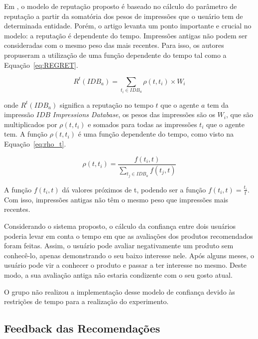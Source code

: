  Em \cite{sabater2001regret}, o modelo de reputação proposto é baseado no cálculo do parâmetro de reputação a partir da somatória dos pesos de impressões que o usuário tem de determinada entidade. Porém, o artigo levanta um ponto importante e crucial no modelo: a reputação é dependente do tempo. Impressões antigas não podem ser consideradas com o mesmo peso das mais recentes. Para isso, os autores propuseram a utilização de uma função dependente do tempo tal como a Equação~\ref{eq:REGRET}.
 
\begin{equation}
 R^t(IDB_a) = {\sum_{t_i\in{IDB_a}}}\rho(t,t_i)\times{W_i}
 \label{eq:REGRET} 
\end{equation}

 onde $R^t(IDB_a)$ significa a reputação no tempo $t$ que o agente $a$ tem da impressão $IDB$ \textit{Impressions Database}, os pesos das impressões são os $W_i$, que são multiplicados por $\rho(t,t_i)$ e somados para todas as impressões $t_i$ que o agente tem. A função $\rho(t,t_i)$ é uma função dependente do tempo, como visto na Equação~\ref{eq:rho_t}.
 
\begin{equation}
 \rho(t,t_i) = \frac{f(t_i,t)}{{\sum_{t_j\in{IDB_a}}}f(t_j,t)}
 \label{eq:rho_t} 
\end{equation}

 A função $f(t_i,t)$ dá valores próximos de t, podendo ser a função $f(t_i,t) = \frac{t_i}{t}$. Com isso, impressões antigas não têm o mesmo peso que impressões mais recentes.

 Considerando o sistema proposto, o cálculo da confiança entre dois usuários poderia levar em conta o tempo em que as avaliações dos produtos recomendados foram feitas. Assim, o usuário pode avaliar negativamente um produto sem conhecê-lo, apenas demonstrando o seu baixo interesse nele. Após alguns meses, o usuário pode vir a conhecer o produto e passar a ter interesse no mesmo. Deste modo, a sua avaliação antiga não estaria condizente com o seu gosto atual.
 
 O grupo não realizou a implementação desse modelo de confiança devido às restrições de tempo para a realização do experimento.


\subsection{Feedback das Recomendações} %
\label{sub:feedback_das_recomendacoes}

